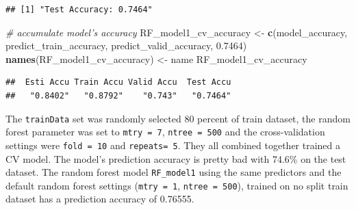 \documentclass[
]{book}
\newenvironment{Shaded}{\begin{snugshade}}{\end{snugshade}}
\newcommand{\CommentTok}[1]{\textcolor[rgb]{0.56,0.35,0.01}{\textit{#1}}}
\newcommand{\DataTypeTok}[1]{\textcolor[rgb]{0.13,0.29,0.53}{#1}}
\newcommand{\FloatTok}[1]{\textcolor[rgb]{0.00,0.00,0.81}{#1}}
\newcommand{\KeywordTok}[1]{\textcolor[rgb]{0.13,0.29,0.53}{\textbf{#1}}}
\newcommand{\NormalTok}[1]{#1}
\newcommand{\OperatorTok}[1]{\textcolor[rgb]{0.81,0.36,0.00}{\textbf{#1}}}
\newcommand{\OtherTok}[1]{\textcolor[rgb]{0.56,0.35,0.01}{#1}}
\newcommand{\StringTok}[1]{\textcolor[rgb]{0.31,0.60,0.02}{#1}}
\begin{document}
\begin{Shaded}
\end{Shaded}

\begin{verbatim}
## [1] "Test Accuracy: 0.7464"
\end{verbatim}

\begin{Shaded}
\begin{Highlighting}[]
\CommentTok{# accumulate model's accuracy}
\NormalTok{RF_model1_cv_accuracy <-}\StringTok{ }\KeywordTok{c}\NormalTok{(model_accuracy, predict_train_accuracy, predict_valid_accuracy, }\FloatTok{0.7464}\NormalTok{)}
\KeywordTok{names}\NormalTok{(RF_model1_cv_accuracy) <-}\StringTok{ }\NormalTok{name}
\NormalTok{RF_model1_cv_accuracy}
\end{Highlighting}
\end{Shaded}

\begin{verbatim}
##  Esti Accu Train Accu Valid Accu  Test Accu 
##   "0.8402"   "0.8792"    "0.743"   "0.7464"
\end{verbatim}

The \texttt{trainData} set was randomly selected 80 percent of train dataset, the random forest parameter was set to \texttt{mtry\ =\ 7}, \texttt{ntree\ =\ 500} and the cross-validation settings were \texttt{fold\ =\ 10} and \texttt{repeats=\ 5}. They all combined together trained a CV model. The model's prediction accuracy is pretty bad with 74.6\% on the test dataset. The random forest model \texttt{RF\_model1} using the same predictors and the default random forest settings (\texttt{mtry\ =\ 1}, \texttt{ntree\ =\ 500}), trained on no split train dataset has a prediction accuracy of 0.76555.
\end{document}
